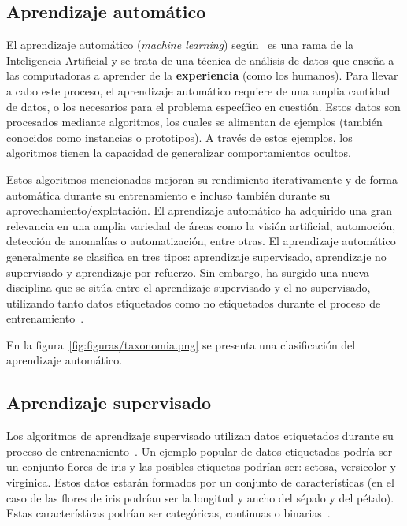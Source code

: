 \medskip

\subsection{Aprendizaje automático}

El aprendizaje automático (\textit{machine
learning}) según~\cite{intelligent:ml} es una rama de la Inteligencia Artificial y se trata de una técnica de análisis de datos que enseña a las computadoras a aprender de la \textbf{experiencia} (como los humanos). Para llevar a cabo este proceso, el aprendizaje automático requiere de una amplia cantidad de datos, o los necesarios para el problema específico en cuestión. Estos datos son procesados mediante algoritmos, los cuales se alimentan de ejemplos (también conocidos como instancias o prototipos). A través de estos ejemplos, los algoritmos tienen la capacidad de generalizar comportamientos ocultos.

Estos algoritmos mencionados mejoran su rendimiento iterativamente y de forma automática durante su entrenamiento e incluso también durante su aprovechamiento/explotación. El aprendizaje automático ha adquirido una gran relevancia en una amplia variedad de áreas como la visión artificial, automoción, detección de anomalías o automatización, entre otras. El aprendizaje automático generalmente se clasifica en tres tipos: aprendizaje supervisado, aprendizaje no supervisado y aprendizaje por refuerzo. Sin embargo, ha surgido una nueva disciplina que se sitúa entre el aprendizaje supervisado y el no supervisado, utilizando tanto datos etiquetados como no etiquetados durante el proceso de entrenamiento~\cite{vanEngelen2020}.

En la figura~\ref{fig:figuras/taxonomia.png} se presenta una clasificación del aprendizaje automático.


\subsection{Aprendizaje supervisado}
\label{aprendizaje-supervisado}

Los algoritmos de aprendizaje supervisado utilizan datos etiquetados durante su proceso de entrenamiento~\cite{david:sl}. Un ejemplo popular de datos etiquetados podría ser un conjunto flores de iris y las posibles etiquetas podrían ser: setosa, versicolor y virginica. Estos datos estarán formados por un conjunto de características (en el caso de las flores de iris podrían ser la longitud y ancho del sépalo y del pétalo). Estas características podrían ser categóricas, continuas o binarias~\cite{salim:sl}.

